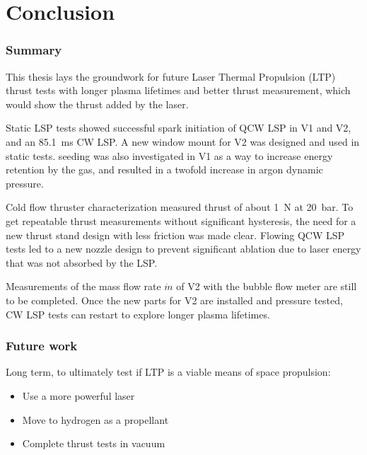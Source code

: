 \chapter{Conclusion}
    \subsection{Summary}

        This thesis lays the groundwork for future Laser Thermal Propulsion (LTP) thrust tests with longer plasma lifetimes and better thrust measurement, which would show the thrust added by the laser.

        Static LSP tests showed successful spark initiation of QCW LSP in V1 and V2, and an \qty{85.1}{ms} CW LSP. A new window mount for V2 was designed and used in static tests.  seeding was also investigated in V1 as a way to increase energy retention by the gas, and resulted in a twofold increase in argon dynamic pressure. 

        Cold flow thruster characterization measured thrust of about \qty{1}{N} at \qty{20}{bar}. To get repeatable thrust measurements without significant hysteresis, the need for a new thrust stand design with less friction was made clear. Flowing QCW LSP tests led to a new nozzle design to prevent significant ablation due to laser energy that was not absorbed by the LSP. 
        
        Measurements of the mass flow rate $\dot m$ of V2 with the bubble flow meter are still to be completed. Once the new parts for V2 are installed and pressure tested, CW LSP tests can restart to explore longer plasma lifetimes.

    \subsection{Future work}

        Long term, to ultimately test if LTP is a viable means of space propulsion:
        \begin{itemize}
            \item Use a more powerful laser
            \item Move to hydrogen as a propellant
            \item Complete thrust tests in vacuum
        \end{itemize}
